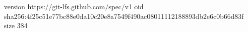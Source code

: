 version https://git-lfs.github.com/spec/v1
oid sha256:4f25c51e77bc88e0da10c20e8a7549f490ac08011112188893db2e6c0b66d83f
size 384

